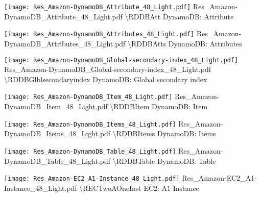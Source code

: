  {\texttt{[image: Res\_Amazon-DynamoDB\_Attribute\_48\_Light.pdf]}} {Res\_Amazon-DynamoDB\_Attribute\_48\_Light.pdf} {{\textbackslash}RDDBAtt} {DynamoDB: Attribute}

 {\texttt{[image: Res\_Amazon-DynamoDB\_Attributes\_48\_Light.pdf]}} {Res\_Amazon-DynamoDB\_Attributes\_48\_Light.pdf} {{\textbackslash}RDDBAtts} {DynamoDB: Attributes}

 {\texttt{[image: Res\_Amazon-DynamoDB\_Global-secondary-index\_48\_Light.pdf]}} {Res\_Amazon-DynamoDB\_Global-secondary-index\_48\_Light.pdf} {{\textbackslash}RDDBGlblsecondaryindex} {DynamoDB: Global secondary index}

 {\texttt{[image: Res\_Amazon-DynamoDB\_Item\_48\_Light.pdf]}} {Res\_Amazon-DynamoDB\_Item\_48\_Light.pdf} {{\textbackslash}RDDBItem} {DynamoDB: Item}

 {\texttt{[image: Res\_Amazon-DynamoDB\_Items\_48\_Light.pdf]}} {Res\_Amazon-DynamoDB\_Items\_48\_Light.pdf} {{\textbackslash}RDDBItems} {DynamoDB: Items}

 {\texttt{[image: Res\_Amazon-DynamoDB\_Table\_48\_Light.pdf]}} {Res\_Amazon-DynamoDB\_Table\_48\_Light.pdf} {{\textbackslash}RDDBTable} {DynamoDB: Table}

 {\texttt{[image: Res\_Amazon-EC2\_A1-Instance\_48\_Light.pdf]}} {Res\_Amazon-EC2\_A1-Instance\_48\_Light.pdf} {{\textbackslash}RECTwoAOneInst} {EC2: A1 Instance}

